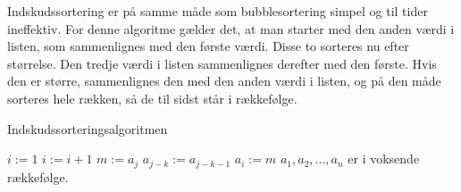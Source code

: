 Indskudssortering er på samme måde som bubblesortering simpel og til tider ineffektiv. For denne algoritme gælder det, at man starter med den anden værdi i listen, som sammenlignes med den første værdi. Disse to sorteres nu efter størrelse. Den tredje værdi i listen sammenlignes derefter med den første. Hvis den er større, sammenlignes den med den anden værdi i listen, og på den måde sorteres hele rækken, så de til sidst står i rækkefølge.

\begin{algorithm}[H]
\caption{Indskudssorteringsalgoritmen}
\begin{algorithmic}[1]

\EndProcedure
{}
	\State $i:=1$
    		\State $i:=i+1$
    	\EndWhile
    	\State $m:=a_{j}$
    		\State $a_{j-k}:=a_{j-k-1}$
    	\EndFor
    	\State $a_{i}:=m$
\EndFor
\State $a_{1},a_{2},\dotsc,a_{n}$ er i voksende rækkefølge. 

\end{algorithmic}
\end{algorithm}

